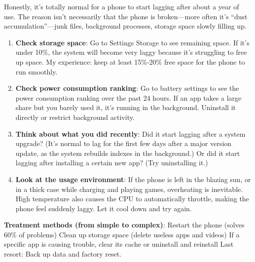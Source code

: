 


Honestly, it's totally normal for a phone to start lagging after about a year of use. The reason isn't necessarily that the phone is broken—more often it's “dust accumulation”—junk files, background processes, storage space slowly filling up.


\begin{enumerate}
  \item \textbf{Check storage space}: Go to Settings Storage to see remaining space. If it's under 10\%, the system will become very laggy because it's struggling to free up space. My experience: keep at least 15\%-20\% free space for the phone to run smoothly.
  \item \textbf{Check power consumption ranking}: Go to battery settings to see the power consumption ranking over the past 24 hours. If an app takes a large share but you barely used it, it's running in the background. Uninstall it directly or restrict background activity.
  \item \textbf{Think about what you did recently}: Did it start lagging after a system upgrade? (It's normal to lag for the first few days after a major version update, as the system rebuilds indexes in the background.) Or did it start lagging after installing a certain new app? (Try uninstalling it.)
  \item \textbf{Look at the usage environment}: If the phone is left in the blazing sun, or in a thick case while charging and playing games, overheating is inevitable. High temperature also causes the CPU to automatically throttle, making the phone feel suddenly laggy. Let it cool down and try again.
\end{enumerate}

\textbf{Treatment methods (from simple to complex)}: Restart the phone (solves 60\% of problems) Clean up storage space (delete useless apps and videos) If a specific app is causing trouble, clear its cache or uninstall and reinstall Last resort: Back up data and factory reset.

